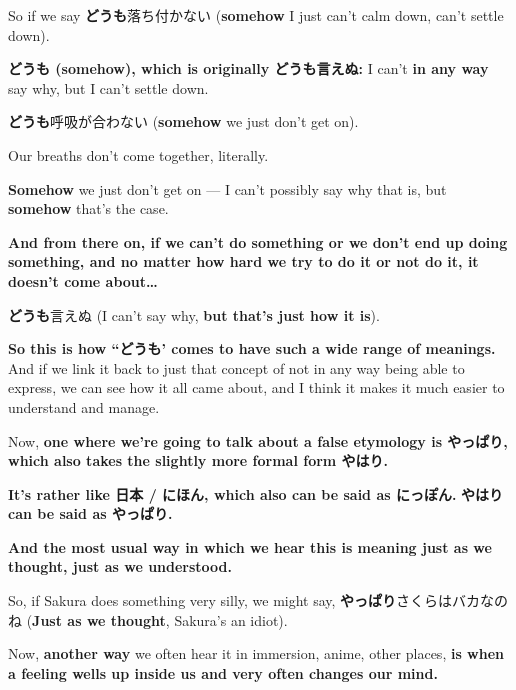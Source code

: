So if we say {\bf どうも}落ち付かない ({\bf somehow} I just can't calm down, can't settle down).

{}

{\bf どうも (somehow), which is originally どうも言えぬ:} I can't {\bf in any way} say why, but I can't settle down.

{\bf どうも}呼吸が合わない ({\bf somehow} we just don't get on).

Our breaths don't come together, literally.

{}

{\bf Somehow} we just don't get on --- I can't possibly say why that is, but {\bf somehow} that's the case.

\thinrule

{\bf And from there on, if we can't do something or we don't end up doing something, and no matter how hard we try to do it or not do it, it doesn't come about\ldots{}}

{\bf どうも}言えぬ (I can't say why, {\bf but that's just how it is}).

{\bf So this is how “どうも' comes to have such a wide range of meanings.} And if we link it back to just that concept of not in any way being able to express, we can see how it all came about, and I think it makes it much easier to understand and manage.

\stopsectionlevel

\startsectionlevel[title={やっぱり / やはり},reference={やっぱり-やはり}]

Now, {\bf one where we're going to talk about a false etymology is やっぱり, which also takes the slightly more formal form やはり.}

{}

{\bf It's rather like 日本 / にほん, which also can be said as にっぽん.} {\bf やはり can be said as やっぱり.}

\thinrule

{\bf And the most usual way in which we hear this is meaning just as we thought, just as we understood.}

So, if Sakura does something very silly, we might say, {\bf やっぱり}さくらはバカなのね ({\bf Just as we thought}, Sakura's an idiot).

{}

Now, {\bf another way} we often hear it in immersion, anime, other places, {\bf is when a feeling wells up inside us and very often changes our mind.}


